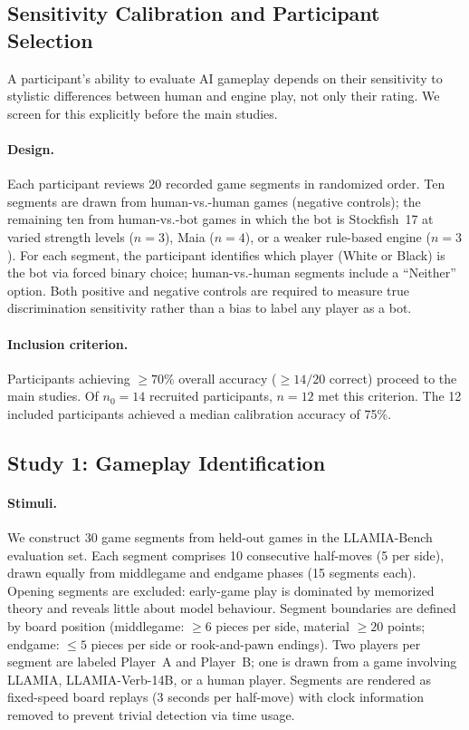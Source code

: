 \subsection{Sensitivity Calibration and Participant Selection}
\label{sec:app_human_calibration}

A participant's ability to evaluate AI gameplay depends on their sensitivity to stylistic differences between human and engine play, not only their rating. We screen for this explicitly before the main studies.

\paragraph{Design.}
Each participant reviews 20 recorded game segments in randomized order. Ten segments are drawn from human-vs.-human games (negative controls); the remaining ten from human-vs.-bot games in which the bot is Stockfish~17 at varied strength levels ($n = 3$), Maia ($n = 4$), or a weaker rule-based engine ($n = 3$). For each segment, the participant identifies which player (White or Black) is the bot via forced binary choice; human-vs.-human segments include a ``Neither'' option. Both positive and negative controls are required to measure true discrimination sensitivity rather than a bias to label any player as a bot.

\paragraph{Inclusion criterion.}
Participants achieving $\geq 70\%$ overall accuracy ($\geq 14{/}20$ correct) proceed to the main studies. Of $n_0 = 14$ recruited participants, $n = 12$ met this criterion. The 12 included participants achieved a median calibration accuracy of 75\%.

\subsection{Study 1: Gameplay Identification}
\label{sec:app_human_gameplay}

\paragraph{Stimuli.}
We construct 30 game segments from held-out games in the LLAMIA-Bench evaluation set. Each segment comprises 10 consecutive half-moves (5 per side), drawn equally from middlegame and endgame phases (15 segments each). Opening segments are excluded: early-game play is dominated by memorized theory and reveals little about model behaviour. Segment boundaries are defined by board position (middlegame: $\geq 6$ pieces per side, material $\geq 20$ points; endgame: $\leq 5$ pieces per side or rook-and-pawn endings). Two players per segment are labeled Player~A and Player~B; one is drawn from a game involving LLAMIA, LLAMIA-Verb-14B, or a human player. Segments are rendered as fixed-speed board replays (3 seconds per half-move) with clock information removed to prevent trivial detection via time usage.

